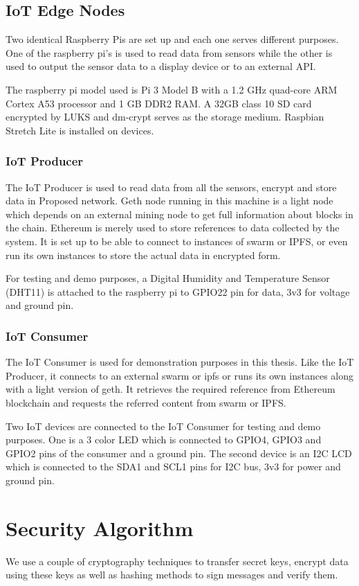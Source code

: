 \documentclass[11pt,openright]{report}
\begin{document}
\subsection{IoT Edge Nodes}
Two identical Raspberry Pis are set up and each one serves different purposes. One of the raspberry pi's is used to read data from sensors while the other is used to output the sensor data to a display device or to an external API.

The raspberry pi model used is Pi 3 Model B with a 1.2 GHz quad-core ARM Cortex A53 processor and 1 GB DDR2 RAM. A 32GB class 10 SD card encrypted by LUKS and dm-crypt serves as the storage medium. Raspbian Stretch Lite is installed on devices.

\subsubsection{IoT Producer}
The IoT Producer is used to read data from all the sensors, encrypt and store data in Proposed network. Geth node running in this machine is a light node which depends on an external mining node to get full information about blocks in the chain. Ethereum is merely used to store references to data collected by the system. It is set up to be able to connect to instances of swarm or IPFS, or even run its own instances to store the actual data in encrypted form.

For testing and demo purposes, a Digital Humidity and Temperature Sensor (DHT11) is attached to the raspberry pi to GPIO22 pin for data, 3v3 for voltage and ground pin.

\subsubsection{IoT Consumer}
The IoT Consumer is used for demonstration purposes in this thesis. Like the IoT Producer, it connects to an external swarm or ipfs or runs its own instances along with a light version of geth. It retrieves the required reference from Ethereum blockchain and requests the referred content from swarm or IPFS.

Two IoT devices are connected to the IoT Consumer for testing and demo purposes. One is a 3 color LED which is connected to GPIO4, GPIO3 and GPIO2 pins of the consumer and a ground pin. The second device is an I2C LCD which is connected to the SDA1 and SCL1 pins for I2C bus, 3v3 for power and ground pin.

\section{Security Algorithm}
We use a couple of cryptography techniques to transfer secret keys, encrypt data using these keys as well as hashing methods to sign messages and verify them.
\end{document}
